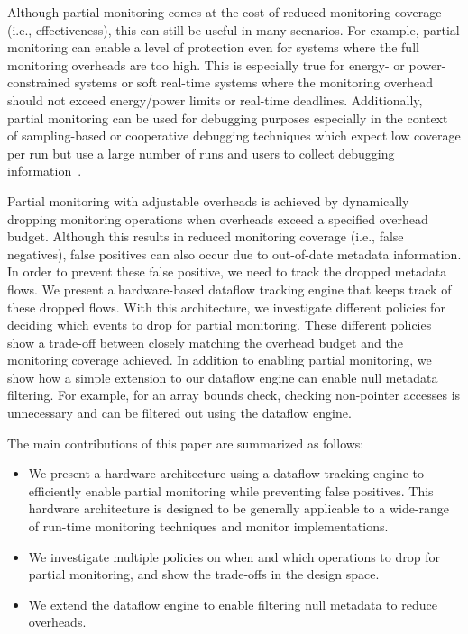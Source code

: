 Although partial monitoring comes at the cost of reduced monitoring coverage (i.e.,
effectiveness), this can still be useful in many scenarios.
For example, partial
monitoring can enable a level of protection even for systems where the full
monitoring overheads are too high. This is especially true for energy- or
power-constrained systems or soft real-time systems where the monitoring
overhead should not exceed energy/power limits or real-time deadlines.
Additionally, partial monitoring can be used for debugging purposes
especially in the context of sampling-based or cooperative debugging techniques
which expect low coverage per run but use a large number of runs and users to
collect debugging information~\cite{liblit-pldi05, chilimbi-asplos04,
greathouse-cgo11}. 

Partial monitoring with adjustable overheads is achieved by dynamically
dropping monitoring operations when overheads exceed a specified overhead
budget. Although this results in reduced monitoring coverage (i.e., false
negatives), false positives can also occur due to out-of-date metadata information.
In order to prevent these
false positive, we need to track the dropped metadata flows.  We present a
hardware-based dataflow tracking engine that keeps track of these dropped
flows. With this architecture, we investigate different policies for deciding
which events to drop for partial monitoring. These different policies show a
trade-off between closely matching the overhead budget and the monitoring
coverage achieved.
In addition to enabling partial monitoring, we show how a simple
extension to our dataflow engine can enable null metadata filtering.
For example, for an array bounds check, checking non-pointer accesses is
unnecessary and can be filtered out using the dataflow engine.

The main contributions of this paper are summarized as follows:
\begin{itemize}
  \item We present a hardware architecture using a dataflow tracking engine to
  efficiently enable partial monitoring while preventing false positives. This
  hardware architecture is designed to be generally applicable to a wide-range
  of run-time monitoring techniques and monitor implementations.
  \item We investigate multiple policies on when and which operations to drop 
  for partial monitoring, and show the trade-offs in the design space.
  \item We extend the dataflow engine to enable filtering null metadata to
  reduce overheads.
\end{itemize}


